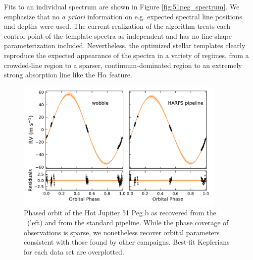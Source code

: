 \documentclass[modern]{aastex62}
\begin{document}
Fits to an individual spectrum are shown in Figure \ref{fig:51peg_spectrum}. 
We emphasize that no \textit{a priori} information on e.g. expected spectral line positions and depths were used. 
The current realization of the \wobble algorithm treats each control point of the template spectra as independent and has no line shape parameterization included. 
Nevertheless, the optimized stellar templates clearly reproduce the expected appearance of the spectra in a variety of regimes, from a crowded-line region to a sparser, continuum-dominated region to an extremely strong absorption line like the H$\alpha$ feature.

\begin{figure}
\centering
\includegraphics[width=4in]{51peg_planet}
\caption{Phased orbit of the Hot Jupiter 51 Peg b as recovered from the \wobble\ \RVs (left) and from the \HARPS standard pipeline. While the phase coverage of \HARPS observations is sparse, we nonetheless recover orbital parameters consistent with those found by other \RV campaigns. Best-fit Keplerians for each data set are overplotted.}
\label{fig:51peg_planet}
\end{figure}
\end{document}
